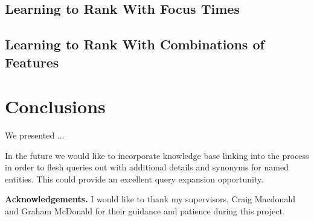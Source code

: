 \documentclass{mpaper}
\begin{document}
\subsection{Learning to Rank With Focus Times}

\subsection{Learning to Rank With Combinations of Features}

\section{Conclusions} \label{sec:conclusion}
We presented ...


In the future we would like to incorporate knowledge base linking into the process in order to flesh queries out with additional details and synonyms for named entities. This could provide an excellent query expansion opportunity.

\vskip8pt \noindent
{\bf Acknowledgements.}
I would like to thank my supervisors, Craig Macdonald and Graham McDonald for their guidance and patience during this project.


\end{document}
